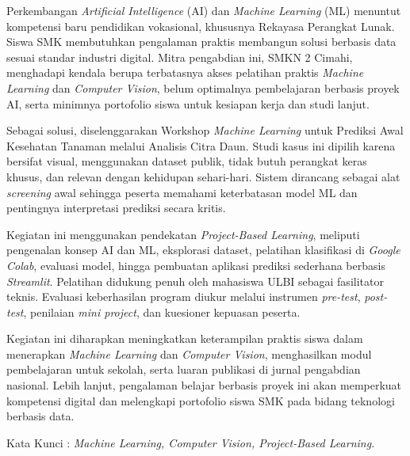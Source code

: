 Perkembangan \textit{Artificial Intelligence} (AI) dan \textit{Machine Learning} (ML) menuntut kompetensi baru pendidikan vokasional, khususnya Rekayasa Perangkat Lunak. Siswa SMK membutuhkan pengalaman praktis membangun solusi berbasis data sesuai standar industri digital. Mitra pengabdian ini, SMKN 2 Cimahi, menghadapi kendala berupa terbatasnya akses pelatihan praktis \textit{Machine Learning} dan \textit{Computer Vision}, belum optimalnya pembelajaran berbasis proyek AI, serta minimnya portofolio siswa untuk kesiapan kerja dan studi lanjut.

Sebagai solusi, diselenggarakan Workshop \textit{Machine Learning} untuk Prediksi Awal Kesehatan Tanaman melalui Analisis Citra Daun. Studi kasus ini dipilih karena bersifat visual, menggunakan dataset publik, tidak butuh perangkat keras khusus, dan relevan dengan kehidupan sehari-hari. Sistem dirancang sebagai alat \textit{screening} awal sehingga peserta memahami keterbatasan model ML dan pentingnya interpretasi prediksi secara kritis.

Kegiatan ini menggunakan pendekatan \textit{Project-Based Learning}, meliputi pengenalan konsep AI dan ML, eksplorasi dataset, pelatihan klasifikasi di \textit{Google Colab}, evaluasi model, hingga pembuatan aplikasi prediksi sederhana berbasis \textit{Streamlit}. Pelatihan didukung penuh oleh mahasiswa ULBI sebagai fasilitator teknis. Evaluasi keberhasilan program diukur melalui instrumen \textit{pre-test}, \textit{post-test}, penilaian \textit{mini project}, dan kuesioner kepuasan peserta.

Kegiatan ini diharapkan meningkatkan keterampilan praktis siswa dalam menerapkan \textit{Machine Learning} dan \textit{Computer Vision}, menghasilkan modul pembelajaran untuk sekolah, serta luaran publikasi di jurnal pengabdian nasional. Lebih lanjut, pengalaman belajar berbasis proyek ini akan memperkuat kompetensi digital dan melengkapi portofolio siswa SMK pada bidang teknologi berbasis data.

\vspace{0.5cm}
\noindent Kata Kunci : \textit{Machine Learning, Computer Vision, Project-Based Learning.}
